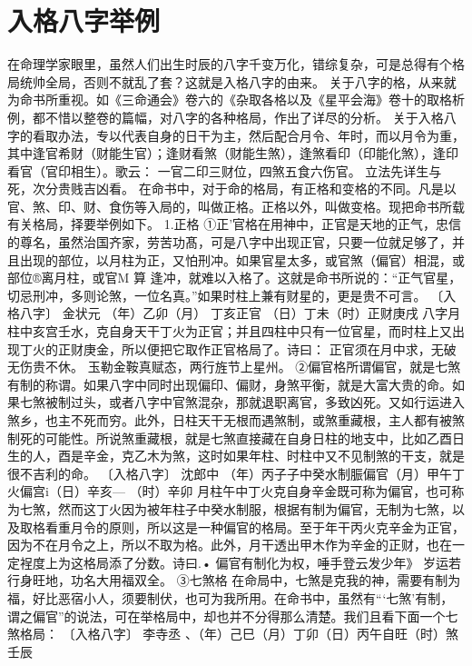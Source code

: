 

\section{入格八字举例}
在命理学家眼里，虽然人们出生时辰的八字千变万化，错综复杂，可是总得有个格局统帅全局，否则不就乱了套？这就是入格八字的由来。
关于八字的格，从来就为命书所重视。如《三命通会》卷六的《杂取各格以及《星平会海》卷十的取格析例，都不惜以整卷的篇幅，对八字的各种格局，作出了详尽的分析。
关于入格八字的看取办法，专以代表自身的日干为主，然后配合月令、年时，而以月令为重，其中逢官希财（财能生官）；逢财看煞（财能生煞），逢煞看印（印能化煞），逢印看官（官印相生）。歌云：
一官二印三财位，四煞五食六伤官。
立法先详生与死，次分贵贱吉凶看。
在命书中，对于命的格局，有正格和变格的不同。凡是以官、煞、印、财、食伤等入局的，叫做正格。正格以外，叫做变格。现把命书所载有关格局，择要举例如下。
1.正格
①正'官格在用神中，正官是天地的正气，忠信的尊名，虽然治国齐家，劳苦功髙，可是八字中出现正官，只要一位就足够了，并且出现的部位，以月柱为正，又怕刑冲。如果官星太多，或官煞（偏官）相混，或部位®离月柱，或官M
算
逢冲，就难以入格了。这就是命书所说的：“正气官星，切忌刑冲，多则论煞，一位名真。”如果时柱上兼有财星的，更是贵不可言。
〔入格八字〕	金状元
（年）乙卯（月）	丁亥正官
（日）丁未（时）正财庚戌
八字月柱中亥宫壬水，克自身天干丁火为正官；并且四柱中只有一位官星，而时柱上又出现丁火的正财庚金，所以便把它取作正官格局了。诗曰：
正官须在月中求，无破无伤贵不休。
玉勒金鞍真赋态，两行旌节上星州。
②偏官格所谓偏官，就是七煞有制的称谓。如果八字中同时出现偏印、偏财，身煞平衡，就是大富大贵的命。如果七煞被制过头，或者八字中官煞混杂，那就退职离官，多致凶死。又如行运进入煞乡，也主不死而穷。此外，日柱天干无根而遇煞制，或煞重藏根，主人都有被煞制死的可能性。所说煞重藏根，就是七煞直接藏在自身日柱的地支中，比如乙酉日生的人，酉是辛金，克乙木为煞，这时如果年柱、时柱中又不见制煞的干支，就是很不吉利的命。
〔入格八字〕	沈郎中
（年）丙子子中癸水制脤偏官（月）甲午丁火偏宫i（日）辛亥—
（时）辛卯
月柱午中丁火克自身辛金既可称为偏官，也可称为七煞，然而这丁火因为被年柱子中癸水制服，根据有制为偏官，无制为七煞，以及取格看重月令的原则，所以这是一种偏官的格局。至于年干丙火克辛金为正官，因为不在月令之上，所以不取为格。此外，月干透出甲木作为辛金的正财，也在一定裎度上为这格局添了分数。诗曰.•
偏官有制化为权，唾手登云发少年》
岁运若行身旺地，功名大用福双全。
③七煞格
在命局中，七煞是克我的神，需要有制为福，好比恶宿小人，须要制伏，也可为我所用。在命书中，虽然有“‘七煞’有制，谓之偏官”的说法，可在举格局中，却也并不分得那么清楚。我们且看下面一个七煞格局：
〔入格八字〕	李寺丞
、（年）己巳（月）丁卯（日）丙午自旺（时）煞壬辰
